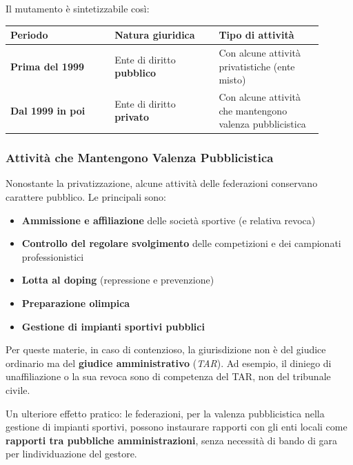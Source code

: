 \documentclass[a4paper,11pt]{article}
\providecommand{\tightlist}{%
  \setlength{\itemsep}{0pt}\setlength{\parskip}{0pt}}
\begin{document}
Il mutamento è sintetizzabile così:

\begin{longtable}[]{@{}p{0.30\linewidth}p{0.30\linewidth}p{0.30\linewidth}@{}}
      \toprule\noalign{}
      Periodo                  & Natura giuridica                  & Tipo di attività \\
      \midrule\noalign{}
      \endhead
      \bottomrule\noalign{}
      \endlastfoot
      \textbf{Prima del 1999}  & Ente di diritto \textbf{pubblico} & Con alcune
      attività privatistiche (ente misto)                                             \\
      \textbf{Dal 1999 in poi} & Ente di diritto \textbf{privato}  & Con alcune
      attività che mantengono valenza pubblicistica                                   \\
\end{longtable}

\subsubsection{Attività che Mantengono Valenza
      Pubblicistica}\label{attivituxe0-che-mantengono-valenza-pubblicistica}

Nonostante la privatizzazione, alcune attività delle federazioni
conservano carattere pubblico. Le principali sono:

\begin{itemize}
      \tightlist
      \item
            \textbf{Ammissione e affiliazione} delle società sportive (e relativa
            revoca)
      \item
            \textbf{Controllo del regolare svolgimento} delle competizioni e dei
            campionati professionistici
      \item
            \textbf{Lotta al doping} (repressione e prevenzione)
      \item
            \textbf{Preparazione olimpica}
      \item
            \textbf{Gestione di impianti sportivi pubblici}
\end{itemize}

Per queste materie, in caso di contenzioso, la giurisdizione non è del
giudice ordinario ma del \textbf{giudice amministrativo} (\emph{TAR}).
Ad esempio, il diniego di un\textquotesingle affiliazione o la sua
revoca sono di competenza del TAR, non del tribunale civile.

Un ulteriore effetto pratico: le federazioni, per la valenza
pubblicistica nella gestione di impianti sportivi, possono instaurare
rapporti con gli enti locali come \textbf{rapporti tra pubbliche
      amministrazioni}, senza necessità di bando di gara per
l\textquotesingle individuazione del gestore.
\end{document}
